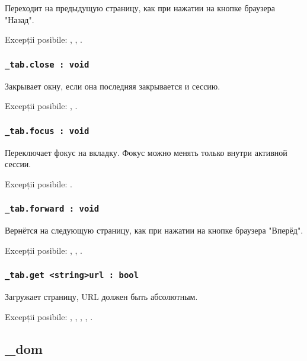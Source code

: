 Переходит на предыдущую страницу, как при нажатии на кнопке браузера "Назад".

Excepții posibile: , , .

\subsubsection{\lstinline|_tab.close : void|}

Закрывает окну, если она последняя закрывается и сессию.

Excepții posibile: , .

\subsubsection{\lstinline|_tab.focus : void|}

Переключает фокус на вкладку. Фокус можно менять только внутри активной сессии.

Excepții posibile: .

\subsubsection{\lstinline|_tab.forward : void|}

Вернётся на следующую страницу, как при нажатии на кнопке браузера "Вперёд".

Excepții posibile: , , .

\subsubsection{\lstinline|_tab.get <string>url : bool|}

Загружает страницу, URL должен быть абсолютным.

Excepții posibile: , , , , .

\subsection{{\color{orange} \_dom}}

